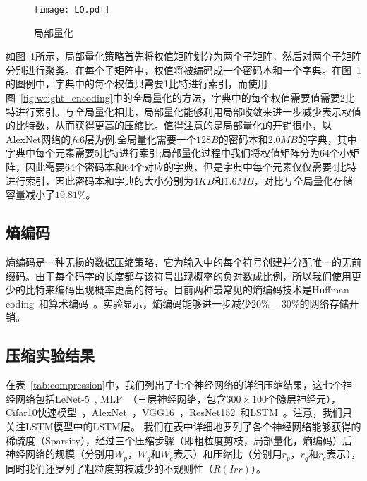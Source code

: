 \begin{figure}[h]
  \centering
  \texttt{[image: LQ.pdf]}
  \caption{局部量化}
  \label{fig:local_quantization}
\end{figure}

如图~\ref{fig:local_quantization}所示，局部量化策略首先将权值矩阵划分为两个子矩阵，然后对两个子矩阵分别进行聚类。在每个子矩阵中，权值将被编码成一个密码本和一个字典。在图~\ref{fig:local_quantization}的图例中，字典中的每个权值只需要1比特进行索引，而使用图~\ref{fig:weight_encoding}中的全局量化的方法，字典中的每个权值需要值需要2比特进行索引。与全局量化相比，局部量化能够利用局部收敛来进一步减少表示权值的比特数，从而获得更高的压缩比。值得注意的是局部量化的开销很小，以AlexNet网络的$fc6$层为例,全局量化需要一个$128B$的密码本和$2.0MB$的字典，其中字典中每个元素需要5比特进行索引;局部量化过程中我们将权值矩阵分为64个小矩阵，因此需要64个密码本和64个对应的字典，但是字典中每个元素仅仅需要4比特进行索引，因此密码本和字典的大小分别为$4KB$和$1.6MB$，对比与全局量化存储容量减小了$19.81\%$。


\subsection{熵编码}
熵编码是一种无损的数据压缩策略，它为输入中的每个符号创建并分配唯一的无前缀码。由于每个码字的长度都与该符号出现概率的负对数成比例，所以我们使用更少的比特来编码出现概率更高的符号。目前两种最常见的熵编码技术是Huffman coding~\cite{huffman1952method}和算术编码~\cite{witten1987arithmetic}。实验显示，熵编码能够进一步减少$20\% - 30\%$的网络存储开销。

\subsection{压缩实验结果}
在表~\ref{tab:compression}中，我们列出了七个神经网络的详细压缩结果，这七个神经网络包括LeNet-5~\cite{lecun1998gradient}, MLP~\cite{Srivastava2014}（三层神经网络，包含$300\times 100$个隐层神经元），Cifar10快速模型~\cite{krizhevsky2012cuda}，AlexNet~\cite{krizhevsky2012imagenet}，VGG16~\cite{simonyan2014very}，ResNet152~\cite{he2016deep}和LSTM~\cite{sak2014long}。注意，我们只关注LSTM模型中的LSTM层。
我们在表中详细地罗列了各个神经网络能够获得的稀疏度（Sparsity），经过三个压缩步骤（即粗粒度剪枝，局部量化，熵编码）后神经网络的规模（分别用$W_p$，$W_q$和$W_c$表示）和压缩比（分别用$r_p$，$r_q$和$r_c$表示），同时我们还罗列了粗粒度剪枝减少的不规则性（$R(Irr)$）。


